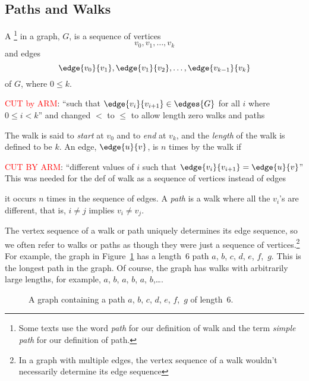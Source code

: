 \subsection{Paths and Walks}

\begin{definition}\label{def:undirected-path}
A \footnote{Some texts use the word \emph{path} for our
  definition of walk and the term \emph{simple path} for our
  definition of path.} in a graph, $G$, is a sequence of vertices
\begin{equation*}
v_0, v_1, \dots, v_k
\end{equation*}
and edges
\begin{equation*}
    \edge{v_0}{v_1}, \edge{v_1}{v_2}, \dots, \edge{v_{k - 1}}{v_k}
\end{equation*}
of $G$, where $0 \leq k$.
\begin{editingnotes}
   \textcolor{red}{CUT by ARM}: ``such that $\edge{v_i}{v_{i+1}}
  \in \edges{G}$ for all $i$ where $0 \leq i < k$'' and changed $<$ to
  $\leq$ to allow length zero walks and paths
\end{editingnotes}
 The walk is said to
\emph{start} at $v_0$ and to \emph{end} at $v_k$, and the \emph{length} of the walk is defined to be $k$.  An edge,
$\edge{u}{v}$, is  $n$ times by the walk if
\begin{editingnotes}
  \textcolor{red}{CUT BY ARM}:
  ``different values of $i$ such that $\edge{v_i}{v_{i+1}} =
  \edge{u}{v}$'' This was needed for the def of walk as a sequence of
  vertices instead of edges
\end{editingnotes} it occurs $n$ times in the sequence of
edges.  A \emph{path} is a walk where all the $v_i$'s are different,
that is, $i\neq j$ implies $v_i \neq v_j$.
\end{definition}

 The vertex sequence of a walk or path uniquely
determines its edge sequence, so we often refer to walks or paths as
though they were just a sequence of vertices.\footnote{In a graph with
  multiple edges, the vertex sequence of a walk wouldn't necessarily
  determine its edge sequence}
For example, the graph in Figure~\ref{dg} has a length~6 path $a$,
$b$, $c$, $d$, $e$, $f$,~$g$.  This is the longest path in the graph.
Of course, the graph has walks with arbitrarily large lengths, for
example, $a$, $b$, $a$, $b$, $a$, $b$,\dots.

\begin{figure}[htbp]


\caption{A graph containing a path $a$, $b$, $c$, $d$, $e$, $f$,~$g$
  of length~6.}
\label{dg}
\end{figure}

